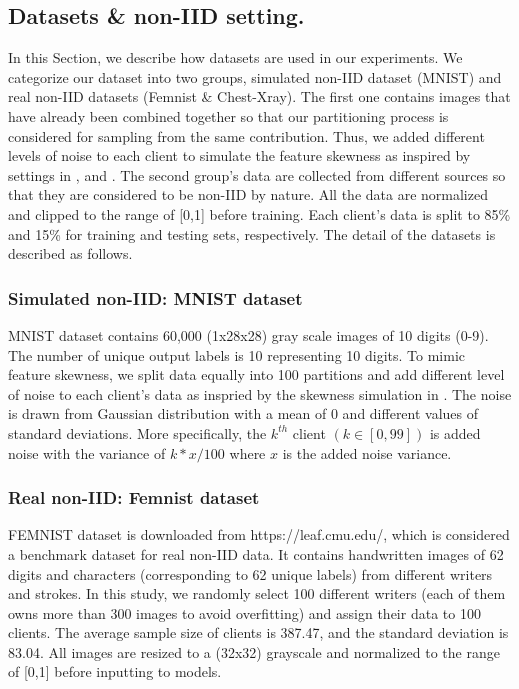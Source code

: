 \documentclass[journal]{IEEEtai}
\newcommand\parties{100}
\begin{document}
\subsection{Datasets \& non-IID setting.}
In this Section, we describe how datasets are used in our experiments. We categorize our dataset into two groups, simulated non-IID dataset (MNIST) and real non-IID datasets (Femnist \& Chest-Xray). The first one contains images that have already been combined together so that our partitioning process is considered for sampling from the same contribution. Thus, we added different levels of noise to each client to simulate the feature skewness as inspired by settings in \cite{abs-2102-02079}, and \cite{fedpcl}. The second group's data are collected from different sources so that they are considered to be non-IID by nature. All the data are normalized and clipped to the range of [0,1] before training. Each client's data is split to 85\% and 15\% for training and testing sets, respectively. The detail of the datasets is described as follows.  

\subsubsection{Simulated non-IID: MNIST dataset}
MNIST dataset \cite{deng2012mnist} contains 60,000 (1x28x28) gray scale images of 10 digits (0-9). The number of unique output labels is 10 representing 10 digits. To mimic feature skewness, we split data equally into \parties{} partitions and add different level of noise to each client's data as inspried by the skewness simulation in \cite{abs-2102-02079}. The noise is drawn from Gaussian distribution with a mean of 0 and different values of standard deviations. More specifically, the $k^{th}$ client $(k \in [0,99])$ is added noise with the variance of $k*x/100$ where $x$ is the added noise variance.  

\subsubsection{Real non-IID: Femnist dataset}
FEMNIST dataset is downloaded from https://leaf.cmu.edu/, which is considered a benchmark dataset for real non-IID data. It contains handwritten images of 62 digits and characters (corresponding to 62 unique labels) from different writers and strokes. In this study, we randomly select \parties{} different writers (each of them owns more than 300 images to avoid overfitting) and assign their data to \parties{} clients. The average sample size of clients is 387.47, and the standard deviation is 83.04. All images are resized to a (32x32) grayscale and normalized to the range of [0,1] before inputting to models.
\end{document}
